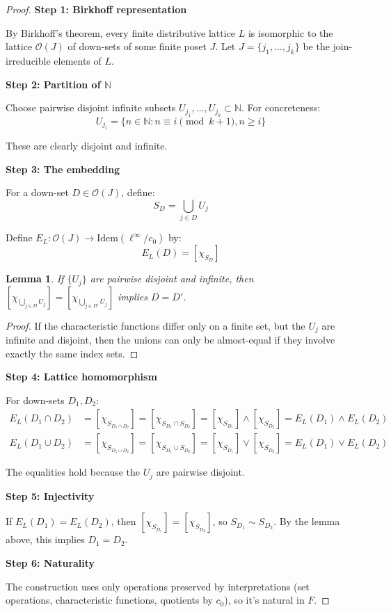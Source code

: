 \documentclass[11pt]{article}
\newtheorem{lemma}[theorem]{Lemma}
\theoremstyle{definition}
\theoremstyle{remark}
\newcommand{\N}{\mathbb{N}}
\newcommand{\cnull}{c_0}
\newcommand{\linf}{\ell^\infty}
\begin{document}
\begin{proof}
\textbf{Step 1: Birkhoff representation}

By Birkhoff's theorem, every finite distributive lattice \(L\) is isomorphic to the lattice \(\mathcal{O}(J)\) of down-sets of some finite poset \(J\). Let \(J = \{j_1, \ldots, j_k\}\) be the join-irreducible elements of \(L\).

\textbf{Step 2: Partition of \(\N\)}

Choose pairwise disjoint infinite subsets \(U_{j_1}, \ldots, U_{j_k} \subset \N\). For concreteness:
\[U_{j_i} = \{n \in \N : n \equiv i \pmod{k+1}, n \geq i\}\]

These are clearly disjoint and infinite.

\textbf{Step 3: The embedding}

For a down-set \(D \in \mathcal{O}(J)\), define:
\[S_D = \bigcup_{j \in D} U_j\]

Define \(E_L: \mathcal{O}(J) \to \mathrm{Idem}(\linf/\cnull)\) by:
\[E_L(D) = [\chi_{S_D}]\]

\begin{lemma}
If \(\{U_j\}\) are pairwise disjoint and infinite, then \([\chi_{\bigcup_{j\in D}U_j}] = [\chi_{\bigcup_{j\in D'}U_j}]\) implies \(D = D'\).
\end{lemma}

\begin{proof}
If the characteristic functions differ only on a finite set, but the \(U_j\) are infinite and disjoint, then the unions can only be almost-equal if they involve exactly the same index sets.
\end{proof}

\textbf{Step 4: Lattice homomorphism}

For down-sets \(D_1, D_2\):
\begin{align}
E_L(D_1 \cap D_2) &= [\chi_{S_{D_1 \cap D_2}}] = [\chi_{S_{D_1} \cap S_{D_2}}] = [\chi_{S_{D_1}}] \wedge [\chi_{S_{D_2}}] = E_L(D_1) \wedge E_L(D_2) \\
E_L(D_1 \cup D_2) &= [\chi_{S_{D_1 \cup D_2}}] = [\chi_{S_{D_1} \cup S_{D_2}}] = [\chi_{S_{D_1}}] \vee [\chi_{S_{D_2}}] = E_L(D_1) \vee E_L(D_2)
\end{align}

The equalities hold because the \(U_j\) are pairwise disjoint.

\textbf{Step 5: Injectivity}

If \(E_L(D_1) = E_L(D_2)\), then \([\chi_{S_{D_1}}] = [\chi_{S_{D_2}}]\), so \(S_{D_1} \sim S_{D_2}\). By the lemma above, this implies \(D_1 = D_2\).

\textbf{Step 6: Naturality}

The construction uses only operations preserved by interpretations (set operations, characteristic functions, quotients by \(\cnull\)), so it's natural in \(F\).
\end{proof}
\end{document}
